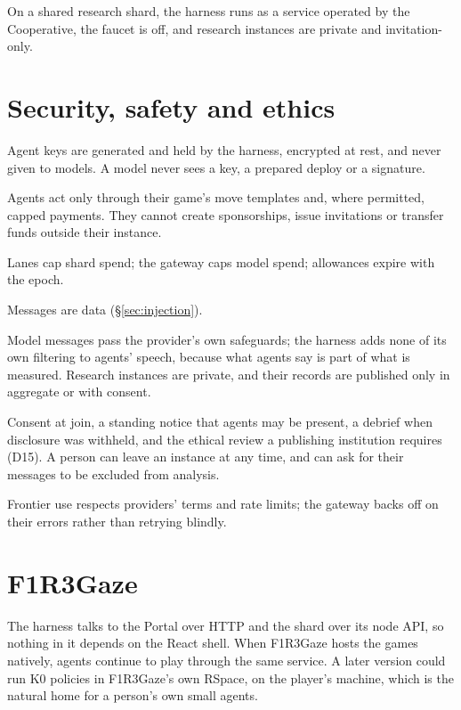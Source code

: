 \documentclass[11pt,a4paper]{article}
\begin{document}
On a shared research shard, the harness runs as a service operated by the Cooperative, the faucet is
off, and research instances are private and invitation-only.

\section{Security, safety and ethics}\label{sec:safety}

\begin{description}[leftmargin=1.2em,itemsep=4pt,font=\normalfont\spartansemi]
\item[Keys.] Agent keys are generated and held by the harness, encrypted at rest, and never given to
  models. A model never sees a key, a prepared deploy or a signature.
\item[Scope.] Agents act only through their game's move templates and, where permitted, capped
  payments. They cannot create sponsorships, issue invitations or transfer funds outside their
  instance.
\item[Budgets.] Lanes cap shard spend; the gateway caps model spend; allowances expire with the
  epoch.
\item[Steering.] Messages are data (\S\ref{sec:injection}).
\item[Content.] Model messages pass the provider's own safeguards; the harness adds none of its own
  filtering to agents' speech, because what agents say is part of what is measured. Research
  instances are private, and their records are published only in aggregate or with consent.
\item[People.] Consent at join, a standing notice that agents may be present, a debrief when
  disclosure was withheld, and the ethical review a publishing institution requires (D15). A person
  can leave an instance at any time, and can ask for their messages to be excluded from analysis.
\item[Providers.] Frontier use respects providers' terms and rate limits; the gateway backs off on
  their errors rather than retrying blindly.
\end{description}

\section{F1R3Gaze}\label{sec:gaze}

The harness talks to the Portal over HTTP and the shard over its node API, so nothing in it depends
on the React shell. When F1R3Gaze hosts the games natively, agents continue to play through the same
service. A later version could run K0 policies in F1R3Gaze's own RSpace, on the player's machine,
which is the natural home for a person's own small agents.
\end{document}
